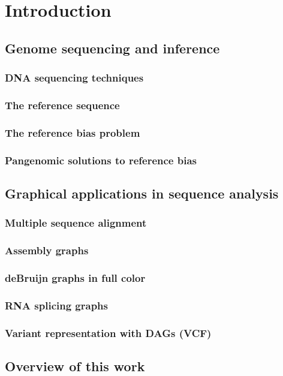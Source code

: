 
\chapter{Introduction}  %

\ifpdf
    \graphicspath{{Chapter1/Figs/Raster/}{Chapter1/Figs/PDF/}{Chapter1/Figs/}}
\else
    \graphicspath{{Chapter1/Figs/Vector/}{Chapter1/Figs/}}
\fi


\section{Genome sequencing and inference}

\subsection{DNA sequencing techniques}

\subsection{The reference sequence}

\subsection{The reference bias problem}

\subsection{Pangenomic solutions to reference bias}

\section{Graphical applications in sequence analysis}

\subsection{Multiple sequence alignment}

\subsection{Assembly graphs}

\subsection{deBruijn graphs in full color}

\subsection{RNA splicing graphs}

\subsection{Variant representation with DAGs (VCF)}

\section{Overview of this work}


